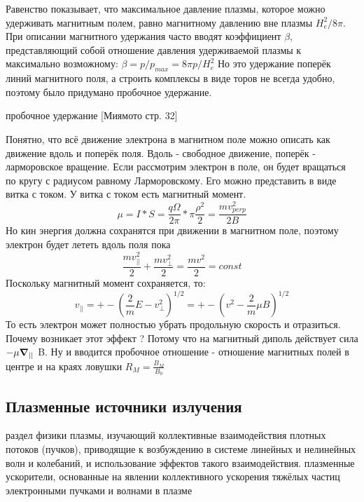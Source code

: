 \documentclass[10pt, a4paper]{article}
\numberwithin{equation}{section}
\begin{document}
Равенство показывает, что максимальное давление плазмы, которое можно удерживать магнитным полем, равно магнитному давлению вне плазмы $H_{e}^{2}/8\pi$. При описании магнитного удержания часто вводят коэффициент $\beta$, представляющий собой
отношение давления удерживаемой плазмы к максимально возможному: $\beta=p/p_{max}=8\pi p/H_{e}^{2}$
Но это удержание поперёк линий магнитного поля, а строить комплексы в виде торов не всегда удобно, поэтому было придумано пробочное удержание.

пробочное удержание [Миямото стр. 32]

Понятно, что всё движение электрона в магнитном поле можно описать как движение вдоль и поперёк поля. Вдоль - свободное движение, поперёк - ларморовское вращение.
Если рассмотрим электрон в поле, он будет вращаться по кругу с радиусом равному Ларморовскому. Его можно представить в виде витка с током. У витка с током есть магнитный момент.
\begin{equation}
	\label{eq.Disp14.1.9}
 \mu=I*S=\frac{q\Omega}{2\pi} * \pi \frac{\rho^{2}}{2}=\frac{mv_{perp}^{2}}{2B}
\end{equation}	
Но кин энергия должна сохранятся при движении в магнитном поле, поэтому электрон будет лететь вдоль поля пока
\begin{equation}
	\label{eq.Disp14.1.10}
	\frac{mv_{||}^{2}}{2}+\frac{mv_{\perp}^{2}}{2}=\frac{mv^{2}}{2}=const
\end{equation}	
Поскольку магнитный момент сохраняется, то:
\begin{equation}
	\label{eq.Disp14.1.11}
 v_{||}=+-(\frac{2}{m}E-v_{\perp}^{2})^{1/2}=+-(v^{2}-\frac{2}{m} \mu B)^{1/2}
\end{equation}	
То есть электрон может полностью убрать продольную скорость и отразиться. Почему возникает этот эффект ? Потому что на магнитный диполь действует сила $-\mu \grad_{||}$ B. Ну и вводится пробочное отношение - отношение магнитных полей в центре и на краях ловушки $R_M=\frac{B_M}{B_0}$


\subsection{Плазменные источники излучения}
\label{14.4} 
раздел физики плазмы, изучающий коллективные взаимодействия плотных потоков (пучков), приводящие к возбуждению в системе линейных и нелинейных волн и колебаний, и использование эффектов такого взаимодействия.
плазменные ускорители, основанные на явлении коллективного ускорения тяжёлых частиц электронными пучками и волнами в плазме
\end{document}
